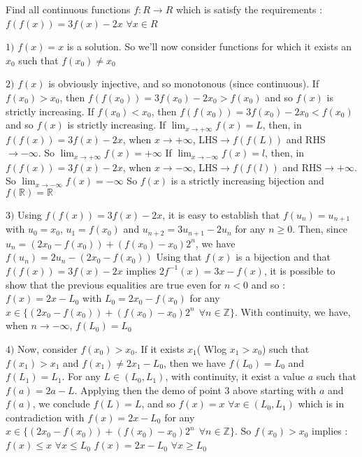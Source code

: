 \begin{mysolution}
	\begin{tcolorbox}Find all continuous functions $ f : R \to R$ which is satisfy the requirements :
$ f(f(x)) = 3f(x) - 2x$ $ \forall x \in R$\end{tcolorbox}

$ 1)$ $ f(x) = x$ is a solution.
So we'll now consider functions for which it exists an $ x_0$ such that $ f(x_0)\neq x_0$

$ 2)$ $ f(x)$ is obviously injective, and so monotonous (since continuous).
If $ f(x_0) > x_0$, then $ f(f(x_0)) = 3f(x_0) - 2x_0 > f(x_0)$ and so $ f(x)$ is strictly increasing.
If $ f(x_0) < x_0$, then $ f(f(x_0)) = 3f(x_0) - 2x_0 < f(x_0)$ and so $ f(x)$ is strictly increasing.
If $ \lim_{x\rightarrow + \infty}f(x) = L$, then, in $ f(f(x)) = 3f(x) - 2x$, when $ x\rightarrow + \infty$, LHS$ \rightarrow f(f(L))$ and RHS$ \rightarrow - \infty$. So $ \lim_{x\rightarrow + \infty}f(x) = + \infty$
If $ \lim_{x\rightarrow - \infty}f(x) = l$, then, in $ f(f(x)) = 3f(x) - 2x$, when $ x\rightarrow - \infty$, LHS$ \rightarrow f(f(l))$ and RHS$ \rightarrow + \infty$. So $ \lim_{x\rightarrow - \infty}f(x) = - \infty$
So $ f(x)$ is a strictly increasing bijection and $ f(\mathbb{R}) = \mathbb{R}$

$ 3)$ Using $ f(f(x)) = 3f(x) - 2x$, it is easy to establish that $ f(u_{n}) = u_{n + 1}$ with $ u_0 = x_0$, $ u_1 = f(x_0)$ and $ u_{n + 2} = 3u_{n + 1} - 2u_n$ for any $ n\geq 0$. Then, since $ u_n = (2x_0 - f(x_0)) + (f(x_0) - x_0)2^n$, we have $ f(u_n) = 2u_n - (2x_0 - f(x_0))$
Using that $ f(x)$ is a bijection and that $ f(f(x)) = 3f(x) - 2x$ implies $ 2f^{ - 1}(x) = 3x - f(x)$, it is possible to show that the previous equalities are true even for $ n < 0$ and so :
$ f(x) = 2x - L_0$ with $ L_0 = 2x_0 - f(x_0)$ for any $ x\in\{(2x_0 - f(x_0)) + (f(x_0) - x_0)2^n\: \: \forall n\in\mathbb{Z}\}$.
With continuity, we have, when $ n\rightarrow - \infty$, $ f(L_0) = L_0$ 

$ 4)$ Now, consider $ f(x_0) > x_0$. If it exists $ x_1$( Wlog $ x_1 > x_0$) such that $ f(x_1) > x_1$ and $ f(x_1)\neq 2x_1 - L_0$, then we have $ f(L_0) = L_0$ and $ f(L_1) = L_1$.
For any $ L\in(L_0,L_1)$, with continuity, it exist a value $ a$ such that $ f(a) = 2a - L$. Applying then the demo of point 3 above starting with $ a$ and $ f(a)$, we conclude $ f(L) = L$, and so $ f(x) = x$ $ \forall x\in(L_0,L_1)$ which is in contradiction with $ f(x) = 2x - L_0$ for any $ x\in\{(2x_0 - f(x_0)) + (f(x_0) - x_0)2^n\: \: \forall n\in\mathbb{Z}\}$.
So $ f(x_0) > x_0$  implies :
$ f(x)\leq x$ $ \forall x\leq L_0$
$ f(x) = 2x - L_0$ $ \forall x\geq L_0$


\end{mysolution}
